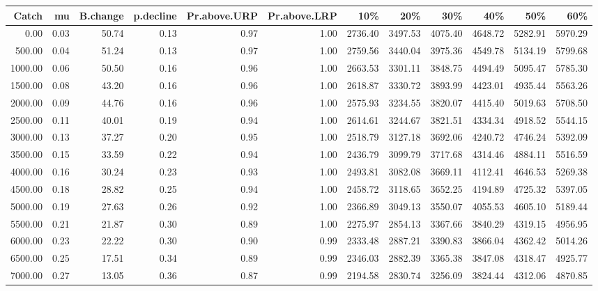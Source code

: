 \begin{table}[ht]
\centering
\begin{tabular}{rrrrrrrrrrrr}
  \hline
Catch & mu & B.change & p.decline & Pr.above.URP & Pr.above.LRP & 10\% & 20\% & 30\% & 40\% & 50\% & 60\% \\ 
  \hline
0.00 & 0.03 & 50.74 & 0.13 & 0.97 & 1.00 & 2736.40 & 3497.53 & 4075.40 & 4648.72 & 5282.91 & 5970.29 \\ 
  500.00 & 0.04 & 51.24 & 0.13 & 0.97 & 1.00 & 2759.56 & 3440.04 & 3975.36 & 4549.78 & 5134.19 & 5799.68 \\ 
  1000.00 & 0.06 & 50.50 & 0.16 & 0.96 & 1.00 & 2663.53 & 3301.11 & 3848.75 & 4494.49 & 5095.47 & 5785.30 \\ 
  1500.00 & 0.08 & 43.20 & 0.16 & 0.96 & 1.00 & 2618.87 & 3330.72 & 3893.99 & 4423.01 & 4935.44 & 5563.26 \\ 
  2000.00 & 0.09 & 44.76 & 0.16 & 0.96 & 1.00 & 2575.93 & 3234.55 & 3820.07 & 4415.40 & 5019.63 & 5708.50 \\ 
  2500.00 & 0.11 & 40.01 & 0.19 & 0.94 & 1.00 & 2614.61 & 3244.67 & 3821.51 & 4334.34 & 4918.52 & 5544.15 \\ 
  3000.00 & 0.13 & 37.27 & 0.20 & 0.95 & 1.00 & 2518.79 & 3127.18 & 3692.06 & 4240.72 & 4746.24 & 5392.09 \\ 
  3500.00 & 0.15 & 33.59 & 0.22 & 0.94 & 1.00 & 2436.79 & 3099.79 & 3717.68 & 4314.46 & 4884.11 & 5516.59 \\ 
  4000.00 & 0.16 & 30.24 & 0.23 & 0.93 & 1.00 & 2493.81 & 3082.08 & 3669.11 & 4112.41 & 4646.53 & 5269.38 \\ 
  4500.00 & 0.18 & 28.82 & 0.25 & 0.94 & 1.00 & 2458.72 & 3118.65 & 3652.25 & 4194.89 & 4725.32 & 5397.05 \\ 
  5000.00 & 0.19 & 27.63 & 0.26 & 0.92 & 1.00 & 2366.89 & 3049.13 & 3550.07 & 4055.53 & 4605.10 & 5189.44 \\ 
  5500.00 & 0.21 & 21.87 & 0.30 & 0.89 & 1.00 & 2275.97 & 2854.13 & 3367.66 & 3840.29 & 4319.15 & 4956.95 \\ 
  6000.00 & 0.23 & 22.22 & 0.30 & 0.90 & 0.99 & 2333.48 & 2887.21 & 3390.83 & 3866.04 & 4362.42 & 5014.26 \\ 
  6500.00 & 0.25 & 17.51 & 0.34 & 0.89 & 0.99 & 2346.03 & 2882.39 & 3365.38 & 3847.08 & 4318.47 & 4925.77 \\ 
  7000.00 & 0.27 & 13.05 & 0.36 & 0.87 & 0.99 & 2194.58 & 2830.74 & 3256.09 & 3824.44 & 4312.06 & 4870.85 \\ 

\end{tabular}
\end{table}
